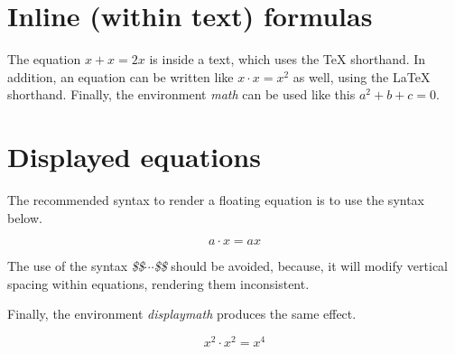 \documentclass{article}
\begin{document}
\section*{Inline (within text) formulas}

The equation $x + x = 2x$ is inside a text, which uses the \TeX{} shorthand.
In addition, an equation can be written like \(x \cdot x = x^2\) as well, using the \LaTeX{} shorthand.
Finally, the environment \emph{math} can be used like this \begin{math}a^2 + b + c = 0\end{math}.

\section*{Displayed equations}

The recommended syntax to render a floating equation is to use the syntax below.

\[a \cdot x = ax \]

The use of the syntax \emph{\$\$$\cdots$\$\$} should be avoided, because, it will modify vertical spacing within equations, rendering them inconsistent.

Finally, the environment \emph{displaymath} produces the same effect.

\begin{displaymath}
	x^2 \cdot x^2 = x^4
\end{displaymath}
\end{document}
